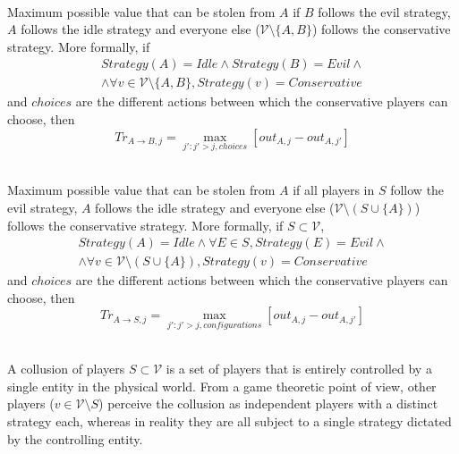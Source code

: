 \documentclass[11pt]{llncs}
\begin{document}
     \begin{definition} \ \\
        Maximum possible value that can be stolen from $A$ if $B$ follows the evil strategy, $A$ follows the idle strategy
        and everyone else ($\mathcal{V} \setminus \{A,B\}$) follows the conservative strategy. More formally, if
        \begin{equation}
        \begin{gathered}
           Strategy\left(A\right) = Idle \wedge Strategy\left(B\right) = Evil \wedge \\
           \wedge \forall v \in \mathcal{V} \setminus \{A,B\}, Strategy\left(v\right) = Conservative
        \end{gathered}
        \end{equation}
        and $choices$ are the different actions between which the conservative players can choose, then
        \begin{equation}
           Tr_{A \rightarrow B, j} = \max\limits_{j' : j' > j, choices}{\left[out_{A,j} - out_{A,j'}\right]}
        \end{equation}
     \end{definition}
     \begin{definition}
        \ \\Maximum possible value that can be stolen from $A$ if all players in $S$ follow the evil strategy, $A$ follows
        the idle strategy and everyone else ($\mathcal{V} \setminus \left(S \cup \{A\}\right)$) follows the conservative
        strategy. More formally, if $S \subset \mathcal{V}$,
        \begin{equation}
        \begin{gathered}
           Strategy\left(A\right) = Idle \wedge \forall E \in S, Strategy\left(E\right) = Evil \wedge \\
           \wedge \forall v \in \mathcal{V} \setminus \left(S \cup \{A\}\right), Strategy\left(v\right) = Conservative
        \end{gathered}
        \end{equation}
        and $choices$ are the different actions between which the conservative players can choose, then
        \begin{equation}
           Tr_{A \rightarrow S, j} = \max\limits_{j' : j' > j, configurations}{\left[out_{A,j} - out_{A,j'}\right]}
        \end{equation}
     \end{definition}
     \begin{definition}[Collusion] \ \\
        A collusion of players $S \subset \mathcal{V}$ is a set of players that is entirely controlled by a single entity in
        the physical world. From a game theoretic point of view, other players ($v \in \mathcal{V} \setminus S$) perceive
        the collusion as independent players with a distinct strategy each, whereas in reality they are all subject to a
        single strategy dictated by the controlling entity.
     \end{definition}
\end{document}
